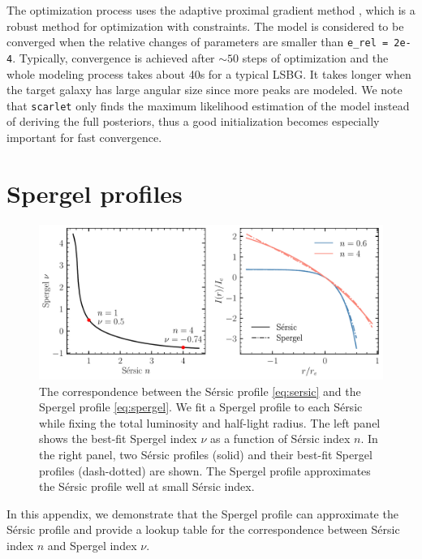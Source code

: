 \documentclass[twocolumn,astrosymb,twocolappendix]{aastex631}
\newcommand{\code}[1]{\texttt{#1}}
\newcommand{\sersic}{S\'ersic}
\begin{document}
\begin{CJK*}{UTF8}{gbsn}
The optimization process uses the adaptive proximal gradient method \citep{Melchior2019}, which is a robust method for optimization with constraints. The model is considered to be converged when the relative changes of parameters are smaller than \code{e\_rel\,=\,2e-4}. Typically, convergence is achieved after $\sim 50$ steps of optimization and the whole modeling process takes about 40s for a typical LSBG. It takes longer when the target galaxy has large angular size since more peaks are modeled. We note that \code{scarlet} only finds the maximum likelihood estimation of the model instead of deriving the full posteriors, thus a good initialization becomes especially important for fast convergence. 


\section{Spergel profiles}\label{ap:spergel}
\begin{figure}[htbp!]
	\vbox{ 
		\centering
		\includegraphics[width=0.75\linewidth]{spergel_sersic_calib.pdf}
	}
    \caption{The correspondence between the \sersic{} profile \eqref{eq:sersic} and the Spergel profile \eqref{eq:spergel}. We fit a Spergel profile to each \sersic{} while fixing the total luminosity and half-light radius. The left panel shows the best-fit Spergel index $\nu$ as a function of \sersic{} index $n$. In the right panel, two \sersic{} profiles (solid) and their best-fit Spergel profiles (dash-dotted) are shown. The Spergel profile approximates the \sersic{} profile well at small \sersic{} index.  
    }
    \label{fig:spgl_calib}
\end{figure}

In this appendix, we demonstrate that the Spergel profile can approximate the \sersic{} profile and provide a lookup table for the correspondence between \sersic{} index $n$ and Spergel index $\nu$.


\end{CJK*}
\end{document}
